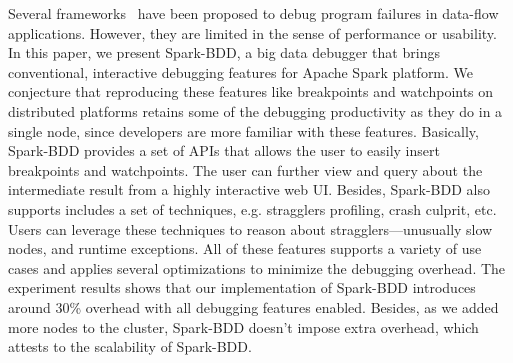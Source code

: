 \documentclass{acm_proc_article-sp}
\begin{document}
Several frameworks~\cite{olston2011inspector, jagannath2011monitoring, dave2013arthur} have been proposed to debug program failures in data-flow applications. However, they are limited in the sense of performance or usability. In this paper, we present Spark-BDD, a big data debugger that brings conventional, interactive debugging features for Apache Spark platform. We conjecture that reproducing these features like breakpoints and watchpoints on distributed platforms retains some of the debugging productivity as they do in a single node, since developers are more familiar with these features. Basically, Spark-BDD provides a set of APIs that allows the user to easily insert breakpoints and watchpoints. The user can further view and query about the intermediate result from a highly interactive web UI. Besides, Spark-BDD also supports includes a set of techniques, e.g. stragglers profiling, crash culprit, etc. Users can leverage these techniques to reason about stragglers---unusually slow nodes, and runtime exceptions. All of these features supports a variety of use cases and applies several optimizations to minimize the debugging overhead. The experiment results shows that our implementation of Spark-BDD introduces around 30\% overhead with all debugging features enabled. Besides, as we added more nodes to the cluster, Spark-BDD doesn't impose extra overhead, which attests to the scalability of Spark-BDD. 
\end{document}
